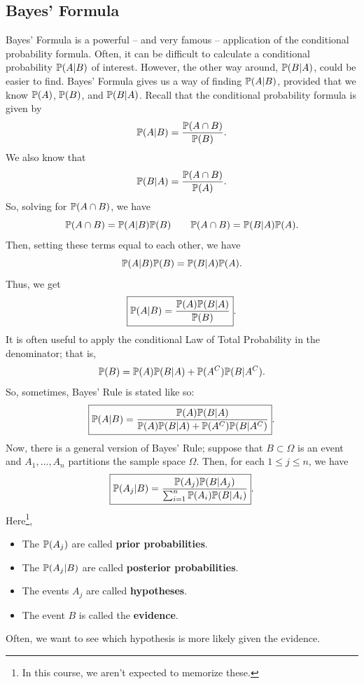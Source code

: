 \subsection{Bayes' Formula}
Bayes' Formula is a powerful -- and very famous -- application of the conditional probability formula. Often, it can be difficult to calculate a conditional probability $\mathbb{P}(A | B)$ of interest. However, the other way around, $\mathbb{P}(B | A)$, could be easier to find. Bayes' Formula gives us a way of finding $\mathbb{P}(A | B)$, provided that we know $\mathbb{P}(A)$, $\mathbb{P}(B)$, and $\mathbb{P}(B | A)$. Recall that the conditional probability formula is given by 
\[\mathbb{P}(A | B) = \frac{\mathbb{P}(A \cap B)}{\mathbb{P}(B)}.\]
We also know that 
\[\mathbb{P}(B | A) = \frac{\mathbb{P}(A \cap B)}{\mathbb{P}(A)}.\]
So, solving for $\mathbb{P}(A \cap B)$, we have 
\[\mathbb{P}(A \cap B) = \mathbb{P}(A | B) \mathbb{P}(B) \qquad \mathbb{P}(A \cap B) = \mathbb{P}(B | A) \mathbb{P}(A).\]
Then, setting these terms equal to each other, we have 
\[\mathbb{P}(A | B) \mathbb{P}(B) = \mathbb{P}(B | A) \mathbb{P}(A).\]
Thus, we get 
\[\boxed{\mathbb{P}(A | B) = \frac{\mathbb{P}(A) \mathbb{P}(B | A)}{\mathbb{P}(B)}}.\]
It is often useful to apply the conditional Law of Total Probability in the denominator; that is,
\[\mathbb{P}(B) = \mathbb{P}(A) \mathbb{P}(B | A) + \mathbb{P}(A^C) \mathbb{P}(B | A^C).\]
So, sometimes, Bayes' Rule is stated like so:
\[\boxed{\mathbb{P}(A | B) = \frac{\mathbb{P}(A) \mathbb{P}(B | A)}{\mathbb{P}(A) \mathbb{P}(B | A) + \mathbb{P}(A^C) \mathbb{P}(B | A^C)}}.\]
Now, there is a general version of Bayes' Rule; suppose that $B \subset \Omega$ is an event and $A_1, \dots, A_n$ partitions the sample space $\Omega$. Then, for each $1 \leq j \leq n$, we have 
\[\boxed{\mathbb{P}(A_j | B) = \frac{\mathbb{P}(A_j) \mathbb{P}(B | A_j)}{\sum_{i = 1}^{n} \mathbb{P}(A_i) \mathbb{P}(B | A_i)}}.\]
Here\footnote{In this course, we aren't expected to memorize these.}, 
\begin{itemize}
    \item The $\mathbb{P}(A_j)$ are called \textbf{prior probabilities}.
    \item The $\mathbb{P}(A_j | B)$ are called \textbf{posterior probabilities}.
    \item The events $A_j$ are called \textbf{hypotheses}.
    \item The event $B$ is called the \textbf{evidence}.
\end{itemize}
Often, we want to see which hypothesis is more likely given the evidence.

